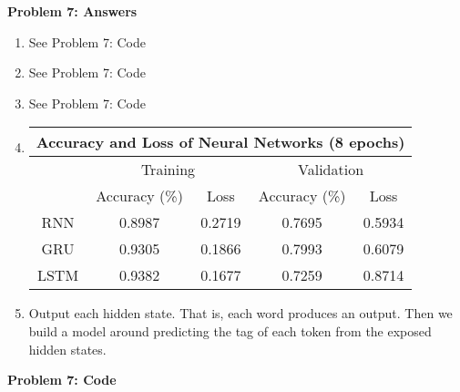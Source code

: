 {\bf Problem 7: Answers}

\begin{enumerate}
    \item See Problem 7: Code
    \item See Problem 7: Code
    \item See Problem 7: Code
    \item 
	\hfill
	\begin{tabular}{ |c|c|c|c|c| }
	    \multicolumn{5}{c}{Accuracy and Loss of Neural Networks (8 epochs)} \\
	    \hline
	    & \multicolumn{2}{c|}{Training} & \multicolumn{2}{c|}{Validation} \\
	    \hline
	    & Accuracy (\%) & Loss & Accuracy (\%) & Loss \\
	    \hline
	    RNN & 0.8987 & 0.2719 & 0.7695 & 0.5934 \\
	    \hline
	    GRU & 0.9305 & 0.1866 & 0.7993 & 0.6079 \\
	    \hline
	    LSTM & 0.9382 & 0.1677 & 0.7259 & 0.8714 \\
	    \hline
	\end{tabular}\hfill\mbox{}
    \item Output each hidden state. That is, each word produces an output. Then we build a model around predicting the tag of each token from the exposed hidden states. 
\end{enumerate}

{\bf Problem 7: Code}
\begin{quote}
    
\end{quote}
